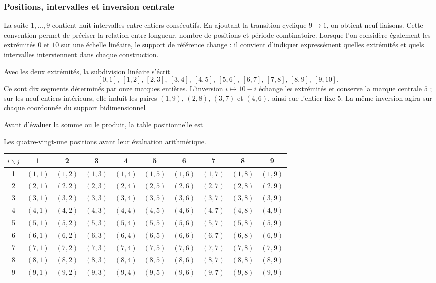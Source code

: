 \subsubsection{Positions, intervalles et inversion centrale}

La suite $1,\ldots,9$ contient huit intervalles entre entiers consécutifs. En ajoutant la transition cyclique $9\to1$, on obtient neuf liaisons. Cette convention permet de préciser la relation entre longueur, nombre de positions et période combinatoire. Lorsque l'on considère également les extrémités $0$ et $10$ sur une échelle linéaire, le support de référence change : il convient d'indiquer expressément quelles extrémités et quels intervalles interviennent dans chaque construction.

Avec les deux extrémités, la subdivision linéaire s'écrit
\[
 [0,1],\ [1,2],\ [2,3],\ [3,4],\ [4,5],\
 [5,6],\ [6,7],\ [7,8],\ [8,9],\ [9,10].
\]
Ce sont dix segments déterminés par onze marques entières. L'inversion $i\mapsto10-i$ échange les extrémités et conserve la marque centrale $5$ ; sur les neuf entiers intérieurs, elle induit les paires $(1,9)$, $(2,8)$, $(3,7)$ et $(4,6)$, ainsi que l'entier fixe $5$. La même inversion agira sur chaque coordonnée du support bidimensionnel.

Avant d'évaluer la somme ou le produit, la table positionnelle est
\begin{tablacompleta}[htbp]
\caption{Les quatre-vingt-une positions avant leur évaluation arithmétique.}
\label{tab:app-posiciones}
{\small\setlength{\tabcolsep}{3pt}
\begin{tabular}{c*{9}{c}}
\toprule
$i\backslash j$ &1&2&3&4&5&6&7&8&9\\
\midrule
1 &$(1,1)$&$(1,2)$&$(1,3)$&$(1,4)$&$(1,5)$&$(1,6)$&$(1,7)$&$(1,8)$&$(1,9)$\\
2 &$(2,1)$&$(2,2)$&$(2,3)$&$(2,4)$&$(2,5)$&$(2,6)$&$(2,7)$&$(2,8)$&$(2,9)$\\
3 &$(3,1)$&$(3,2)$&$(3,3)$&$(3,4)$&$(3,5)$&$(3,6)$&$(3,7)$&$(3,8)$&$(3,9)$\\
4 &$(4,1)$&$(4,2)$&$(4,3)$&$(4,4)$&$(4,5)$&$(4,6)$&$(4,7)$&$(4,8)$&$(4,9)$\\
5 &$(5,1)$&$(5,2)$&$(5,3)$&$(5,4)$&$(5,5)$&$(5,6)$&$(5,7)$&$(5,8)$&$(5,9)$\\
6 &$(6,1)$&$(6,2)$&$(6,3)$&$(6,4)$&$(6,5)$&$(6,6)$&$(6,7)$&$(6,8)$&$(6,9)$\\
7 &$(7,1)$&$(7,2)$&$(7,3)$&$(7,4)$&$(7,5)$&$(7,6)$&$(7,7)$&$(7,8)$&$(7,9)$\\
8 &$(8,1)$&$(8,2)$&$(8,3)$&$(8,4)$&$(8,5)$&$(8,6)$&$(8,7)$&$(8,8)$&$(8,9)$\\
9 &$(9,1)$&$(9,2)$&$(9,3)$&$(9,4)$&$(9,5)$&$(9,6)$&$(9,7)$&$(9,8)$&$(9,9)$\\
\bottomrule
\end{tabular}}
\end{tablacompleta}


